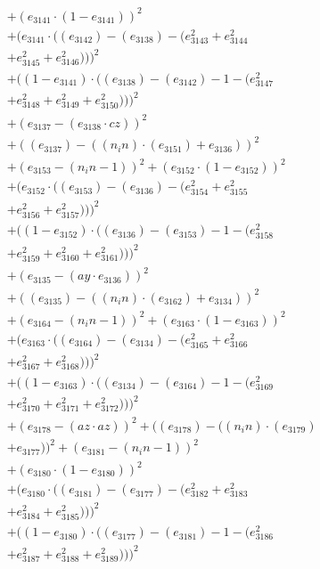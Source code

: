 \documentclass[10pt, a4paper]{article}
\begin{document}
\begin{align*}
& + (e_{3141}  \cdot  (1 - e_{3141}))^{2} \\
& + (e_{3141}  \cdot  ((e_{3142}) - (e_{3138}) - (e_{3143}^{2} + e_{3144}^{2} \\
& + e_{3145}^{2} + e_{3146}^{2})))^{2} \\
& + ((1 - e_{3141})  \cdot  ((e_{3138}) - (e_{3142}) - 1 - (e_{3147}^{2} \\
& + e_{3148}^{2} + e_{3149}^{2} + e_{3150}^{2})))^{2} \\
& + (e_{3137} - (e_{3138}  \cdot  cz))^{2} \\
& + ((e_{3137}) - ((n_in)  \cdot  (e_{3151}) + e_{3136}))^{2} \\
& + (e_{3153} - (n_in - 1))^{2} + (e_{3152}  \cdot  (1 - e_{3152}))^{2} \\
& + (e_{3152}  \cdot  ((e_{3153}) - (e_{3136}) - (e_{3154}^{2} + e_{3155}^{2} \\
& + e_{3156}^{2} + e_{3157}^{2})))^{2} \\
& + ((1 - e_{3152})  \cdot  ((e_{3136}) - (e_{3153}) - 1 - (e_{3158}^{2} \\
& + e_{3159}^{2} + e_{3160}^{2} + e_{3161}^{2})))^{2} \\
& + (e_{3135} - (ay  \cdot  e_{3136}))^{2} \\
& + ((e_{3135}) - ((n_in)  \cdot  (e_{3162}) + e_{3134}))^{2} \\
& + (e_{3164} - (n_in - 1))^{2} + (e_{3163}  \cdot  (1 - e_{3163}))^{2} \\
& + (e_{3163}  \cdot  ((e_{3164}) - (e_{3134}) - (e_{3165}^{2} + e_{3166}^{2} \\
& + e_{3167}^{2} + e_{3168}^{2})))^{2} \\
& + ((1 - e_{3163})  \cdot  ((e_{3134}) - (e_{3164}) - 1 - (e_{3169}^{2} \\
& + e_{3170}^{2} + e_{3171}^{2} + e_{3172}^{2})))^{2} \\
& + (e_{3178} - (az  \cdot  az))^{2} + ((e_{3178}) - ((n_in)  \cdot  (e_{3179}) \\
& + e_{3177}))^{2} + (e_{3181} - (n_in - 1))^{2} \\
& + (e_{3180}  \cdot  (1 - e_{3180}))^{2} \\
& + (e_{3180}  \cdot  ((e_{3181}) - (e_{3177}) - (e_{3182}^{2} + e_{3183}^{2} \\
& + e_{3184}^{2} + e_{3185}^{2})))^{2} \\
& + ((1 - e_{3180})  \cdot  ((e_{3177}) - (e_{3181}) - 1 - (e_{3186}^{2} \\
& + e_{3187}^{2} + e_{3188}^{2} + e_{3189}^{2})))^{2} \\

\end{align*}
\end{document}
